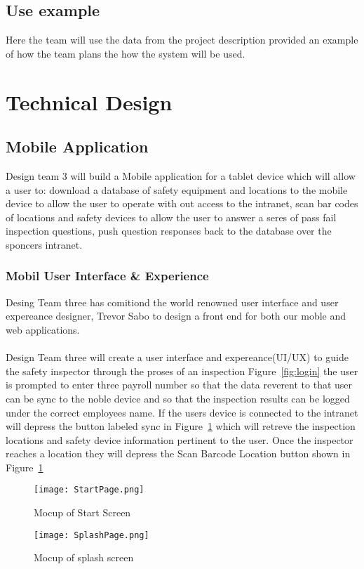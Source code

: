 \documentclass[Letter,11pt]{article}
\begin{document}
	\subsection{Use example}
		Here the team will use the data from the project description provided an example of how the team plans the how the system will be used.
		  
		
\section{Technical Design}
	
	\subsection{Mobile Application}
	Design team 3 will build a Mobile application for a tablet device which will allow a user to: download a database of safety equipment and locations to the mobile device to allow the user to operate with out access to the intranet, scan bar codes of locations and safety devices to allow the user to answer a seres of pass fail inspection questions, push question responses back to the database over the sponcers intranet.
	\subsubsection{Mobil User Interface \& Experience}
	Desing Team three has comitiond the world renowned user interface and user expereance designer, Trevor Sabo to design a front end for both our moble and web applications.\\
	\\
	Design Team three will create a user interface and expereance(UI/UX) to guide the safety inspector through the proses of an inspection Figure~\ref{fig:login} the user is prompted to enter three payroll number so that the data reverent to that user can be sync to the noble device and so that the inspection results can be logged under the correct employees name.
	If the users device is connected to the intranet will depress the button labeled sync in Figure~\ref{fig:splash} which will retreve the inspection locations and safety device information pertinent to the user.
	Once the inspector reaches a location they will depress the Scan Barcode Location button shown in Figure~\ref{fig:splash}
	\begin{figure}[h]
		
		\begin{minipage}{0.5\textwidth}
			\centering
			\texttt{[image: StartPage.png]}
			\caption{\label{fig:login}Mocup of Start Screen}
		\end{minipage}%
		\begin{minipage}{0.5\textwidth}
			\centering
			\texttt{[image: SplashPage.png]}
			\caption{\label{fig:splash}Mocup of splash screen}
		\end{minipage}
	\end{figure}
	
\end{document}
